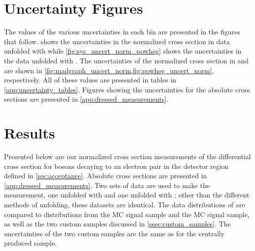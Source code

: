 \section{Uncertainty Figures}

The values of the various uncertainties in each \phistar bin are presented in
the figures that follow.  shows the uncertainties in
the normalized \phistar cross section in data unfolded with \MADGRAPH while
\cref{fig:sys_uncert_norm_powheg} shows the uncertainties in the data unfolded
with \PPsixZtwo. The uncertainties of the normalized \phistar cross section in
\MADGRAPH and \POWHEG are shown in
\cref{fig:madgraph_uncert_norm,fig:powheg_uncert_norm}, respectively. All of
these values are presented in tables in \cref{app:uncertainty_tables}. Figures
showing the uncertainties for the absolute \phistar cross sections are
presented in \cref{app:dressed_measurements}.










\section{Results}
\label{sec:results}

Presented below are our normalized cross section measurements of the
differential \phistar cross section for \Z bosons decaying to an electron pair
in the detector region defined in \cref{sec:acceptance}. Absolute cross
sections are presented in \cref{app:dressed_measurements}. Two sets of data are
used to make the measurement, one unfolded with \MADGRAPH and one unfolded with
\PPsixZtwo; other than the different methods of unfolding, these datasets are
identical. The data distributions of \phistar are compared to distributions
from the \MADGRAPH MC signal sample and the \PPsixZtwo MC signal sample, as
well as the two custom \POWHEG samples discussed in \cref{ssec:custom_samples}.
The uncertainties of the two custom \POWHEG samples are the same as for the
centrally produced sample.

